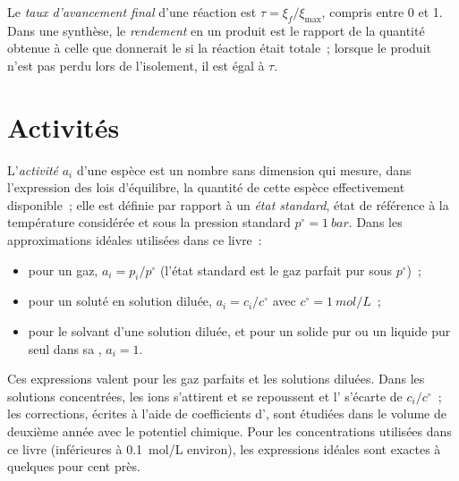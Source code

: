 \begin{definition}\label{def:b1:extent-q-and-k:fractional-extent}
Le \emph{taux d'avancement final} d'une
réaction est $\tau = \xi_f/\xi_{\max}$, compris entre 0 et 1. Dans une
synthèse, le \emph{rendement} en un produit est le rapport
de la quantité obtenue à celle que donnerait le  si la
réaction était totale~; lorsque le produit n'est pas perdu lors de
l'isolement, il est égal à $\tau$.
\end{definition}

\section{Activités}

\begin{definition}\label{def:b1:extent-q-and-k:activity}
L'\emph{activité} $a_i$ d'une espèce est un nombre sans dimension
qui mesure, dans l'expression des lois d'équilibre, la quantité de
cette espèce effectivement disponible~; elle est définie par rapport à
un \emph{état standard}, état de référence à la
température considérée et sous la pression standard
$p^\circ = \qty{1}{bar}$. Dans les approximations idéales utilisées dans
ce livre~:
\begin{itemize}
  \item pour un gaz, $a_i = p_i/p^\circ$ (l'état standard est le gaz
        parfait pur sous $p^\circ$)~;
  \item pour un soluté en solution diluée, $a_i = c_i/c^\circ$ avec
        $c^\circ = \qty{1}{mol/L}$~;
  \item pour le solvant d'une solution diluée, et pour un solide pur ou
        un liquide pur seul dans sa , $a_i = 1$.
\end{itemize}
\end{definition}

\begin{remark}\label{rem:b1:extent-q-and-k:ideal}
Ces expressions valent pour les gaz parfaits et les solutions diluées.
Dans les solutions concentrées, les ions s'attirent et se repoussent et
l' s'écarte de $c_i/c^\circ$~; les corrections, écrites à l'aide
de coefficients d', sont étudiées dans le volume de deuxième
année avec le potentiel chimique. Pour les concentrations utilisées
dans ce livre (inférieures à \qty{0.1}{mol/L} environ), les expressions
idéales sont exactes à quelques pour cent près.
\end{remark}

